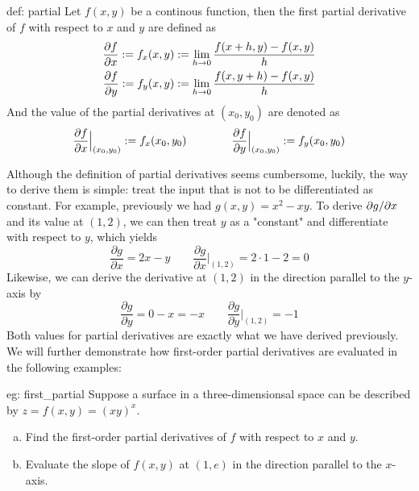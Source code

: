 \begin{defi}{def: partial}
    Let $f(x,y)$ be a continous function, then the first partial derivative of $f$ with respect to $x$ and $y$ are defined as
    \begin{align*}
        \frac{\partial f}{\partial x} := f_x(x,y) &:= \lim_{h \rightarrow 0} \frac{f(x+h,y)-f(x,y)}{h}\\
        \frac{\partial f}{\partial y} := f_y(x, y) &:= \lim_{h \rightarrow 0} \frac{f(x,y+h)-f(x,y)}{h}
    \end{align*}
    And the value of the partial derivatives at $(x_0, y_0)$ are denoted as
    \[\frac{\partial f}{\partial x}\Big|_{(x_0,y_0)} := f_x(x_0, y_0) \qquad\qquad \frac{\partial f}{\partial y}\Big|_{(x_0,y_0)} := f_y(x_0, y_0)\] 
\end{defi}

Although the definition of partial derivatives seems cumbersome, luckily, the way to derive them is simple: treat the input that is not to be differentiated as constant.  For example, previously we had $g(x, y) = x^2-xy$.  To derive $\partial g/\partial x$ and its value at $(1,2)$, we can then treat $y$ as a "constant" and differentiate with respect to $y$, which yields
\[\frac{\partial g}{\partial x} = 2x - y \qquad \frac{\partial g}{\partial x}\Big|_{(1,2)} = 2 \cdot 1 - 2 = 0\]
Likewise, we can derive the derivative at $(1,2)$ in the direction parallel to the $y$-axis by
\[\frac{\partial g}{\partial y} = 0 - x = -x \qquad \frac{\partial g}{\partial y}\Big|_{(1,2)} = -1\]
Both values for partial derivatives are exactly what we have derived previously.  We will further demonstrate how first-order partial derivatives are evaluated in the following examples:

\begin{eg}[]{eg: first_partial}
    Suppose a surface in a three-dimensionsal space can be described by $z = f(x,y) = (xy)^x$.
    \begin{enumerate}[a)]
        \item Find the first-order partial derivatives of $f$ with respect to $x$ and $y$.
        \item Evaluate the slope of $f(x,y)$ at $(1,e)$ in the direction parallel to the $x$-axis.
    \end{enumerate}
\end{eg}

